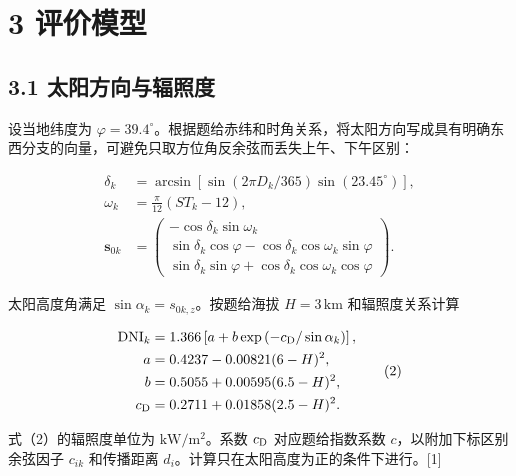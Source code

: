 \documentclass[UTF8,fontset=windows,zihao=-4]{ctexart}
\begin{document}
\section*{3 评价模型}

\subsection*{3.1 太阳方向与辐照度}

\par\noindent\begin{minipage}{\linewidth}
设当地纬度为 \(\varphi=39.4^\circ\)。根据题给赤纬和时角关系，将太阳方向写成具有明确东西分支的向量，可避免只取方位角反余弦而丢失上午、下午区别：

\[
\begin{aligned}
\delta_k&=\arcsin\left[\sin(2\pi D_k/365)\sin(23.45^\circ)\right],\\
\omega_k&=\frac{\pi}{12}(ST_k-12),\\
\boldsymbol s_{0k}&=\begin{pmatrix}
-\cos\delta_k\sin\omega_k\\
\sin\delta_k\cos\varphi-\cos\delta_k\cos\omega_k\sin\varphi\\
\sin\delta_k\sin\varphi+\cos\delta_k\cos\omega_k\cos\varphi
\end{pmatrix}.
\end{aligned}\tag{1}
\]
\end{minipage}\par

\par\noindent\begin{minipage}{\linewidth}
太阳高度角满足 \(\sin\alpha_k=s_{0k,z}\)。按题给海拔 \(H=3\,\mathrm{km}\) 和辐照度关系计算

\[
\begin{aligned}
\mathrm{DNI}_k&=1.366\left[a+b\exp\left(-c_{\rm D}/\sin\alpha_k\right)\right],\\
a&=0.4237-0.00821(6-H)^2,\\
b&=0.5055+0.00595(6.5-H)^2,\\
c_{\rm D}&=0.2711+0.01858(2.5-H)^2.
\end{aligned}\tag{2}
\]
\end{minipage}\par

式（2）的辐照度单位为 \(\mathrm{kW/m^2}\)。系数 \(c_{\rm D}\) 对应题给指数系数 \(c\)，以附加下标区别余弦因子 \(c_{ik}\) 和传播距离 \(d_i\)。计算只在太阳高度为正的条件下进行。[1]
\end{document}
